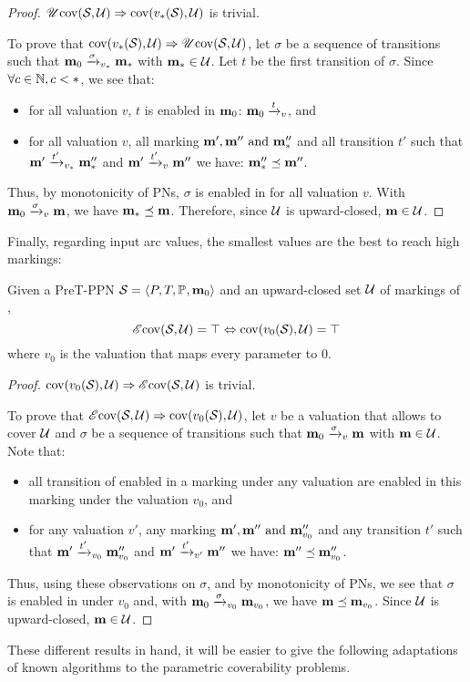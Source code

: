 \begin{proof}
  $\UcovOp(\namePPN, \ucs) \Rightarrow \cov{v_*(\namePPN)}{\ucs}$ is trivial.

  To prove that $\cov{v_*(\namePPN)}{\ucs} \Rightarrow \UcovOp(\namePPN, \ucs)$, let $\sigma$ be a sequence of transitions such that $\mari \fire[v_*]{\sigma} \mar_*$ with $\mar_* \in \ucs$.
  Let $t$ be the first transition of $\sigma$.
  Since $\forall c \in \naturals, c < *$, we see that:
  \begin{itemize}
    \item for all valuation $v$, $t$ is enabled in $\mari$: $\mari \fire[v]{t}$, and
    \item for all valuation $v$, all marking $\mar', \mar'' \text{ and } \mar''_*$ and all transition $t'$ such that $\mar' \fire[v_*]{t'} \mar''_*$ and $\mar' \fire[v]{t'} \mar''$ we have: $\mar''_* \preceq \mar''$.
  \end{itemize}

  Thus, by monotonicity of \acp{PN}, $\sigma$ is enabled in \mari for all valuation $v$.
  With $\mari \fire[v]{\sigma} \mar$, we have $\mar_* \preceq \mar$.
  Therefore, since $\ucs$ is upward-closed, $\mar \in \ucs$.
\end{proof}

Finally, regarding input arc values, the smallest values are the best to reach high markings:

\begin{lemm}
  \label{theo:pre-e-zero-val}
  Given a PreT-\ac{PPN} $\defPPN$ and an upward-closed set $\ucs$ of markings of \namePPN, \[\EcovOp(\namePPN, \ucs) = \top \Leftrightarrow \cov{v_0(\namePPN)}{\ucs} = \top\] where $v_0$ is the valuation that maps every parameter to $0$.
\end{lemm}

\begin{proof}
  $\cov{v_0(\namePPN)}{\ucs} \Rightarrow \EcovOp(\namePPN, \ucs)$ is trivial.

  To prove that $\EcovOp(\namePPN, \ucs) \Rightarrow \cov{v_0(\namePPN)}{\ucs}$, let $v$ be a valuation that allows to cover $\ucs$ and $\sigma$ be a sequence of transitions such that $\mari \fire[v]{\sigma} \mar$ with $\mar \in \ucs$.
  Note that:
  \begin{itemize}
    \item all transition of \namePPN enabled in a marking under any valuation are enabled in this marking under the valuation $v_0$, and
    \item for any valuation $v'$, any marking $\mar', \mar'' \text{ and } \mar''_{v_0}$ and any transition $t'$ such that $\mar' \fire[{v_0}]{t'} \mar''_{v_0}$ and $\mar' \fire[{v'}]{t'} \mar''$ we have: $\mar'' \preceq \mar''_{v_0}$.
  \end{itemize}

  Thus, using these observations on $\sigma$, and by monotonicity of \acp{PN}, we see that $\sigma$ is enabled in \mari under $v_0$ and, with $\mari \fire[{v_0}]{\sigma} \mar_{v_0}$, we have $\mar \preceq \mar_{v_0}$.
  Since $\ucs$ is upward-closed, $\mar \in \ucs$.
\end{proof}

These different results in hand, it will be easier to give the following adaptations of known algorithms to the parametric coverability problems.
